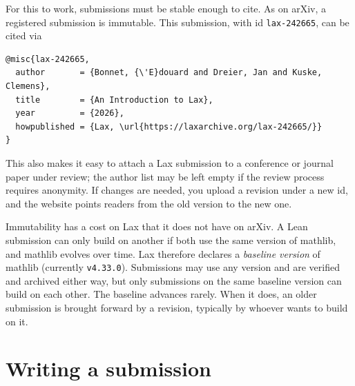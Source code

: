 \documentclass[11pt]{article}
\theoremstyle{plain}
\theoremstyle{definition}
\begin{document}
For this to work, submissions must be stable enough to cite. As on arXiv, a
registered submission is immutable. This submission, with id
\texttt{lax-242665}, can be cited via
\begin{verbatim}
@misc{lax-242665,
  author       = {Bonnet, {\'E}douard and Dreier, Jan and Kuske, Clemens},
  title        = {An Introduction to Lax},
  year         = {2026},
  howpublished = {Lax, \url{https://laxarchive.org/lax-242665/}}
}
\end{verbatim}
This also makes it easy to attach a Lax submission to a conference or journal
paper under review; the author list may be left empty if the review process
requires anonymity. If changes are needed, you upload a revision under a new
id, and the website points readers from the
old version to the new one.

Immutability has a cost on Lax that it does not have on arXiv. A Lean
submission can only build on another if both use the same version of mathlib,
and mathlib evolves over time. Lax therefore declares a \emph{baseline
version} of mathlib (currently \texttt{v4.33.0}). Submissions may use any
version and are verified and archived either way, but only submissions on the
same baseline version can build on each other. The baseline advances rarely.
When it does, an older submission is brought forward by a revision, typically
by whoever wants to build on it.

\section{Writing a submission}
\end{document}
